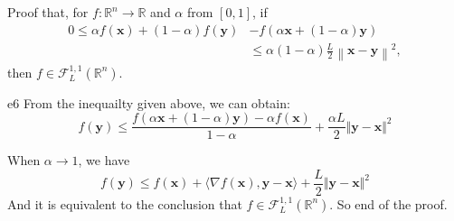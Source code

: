 \documentclass{article}
\newcommand{\xB}{\bm{x}}
\newcommand{\yB}{\bm{y}}
\newcommand{\RBB}{\mathbb{R}}
\newcommand{\FM}{\mathcal{F}}
\newcommand{\functiontype}[3]{\FM_{#1}^{#2,#3}(\RBB^n)}
\newcommand{\normgen}[1]{\left\| #1 \right\|}
\begin{document}
\begin{excercise}\label{e6}
	Proof that, for $f: \RBB^n \rightarrow \RBB$ and $\alpha$ from $[0,1]$,  if
\begin{align*} 
	0  \leq  \alpha f(\xB) + (1-\alpha) f(\yB)  &-  f( \alpha \xB + (1-\alpha) \yB) \nonumber \\
	&\leq \alpha (1-\alpha) \frac{L}{2} \normgen{\xB - \yB}^2,
\end{align*}
	then $f \in \functiontype{L}{1}{1}$.
\end{excercise}
\begin{PROOF}{e6}
	From the inequailty given above, we can obtain:
	\begin{equation}
		f(\yB)\le \frac{f(\alpha \xB+(1-\alpha)\yB)-\alpha f(\xB)}{1-\alpha}+\frac{\alpha L}{2}\Vert \yB-\xB\Vert ^2
	\end{equation}
	
	When $\alpha \rightarrow 1$, we have
	\begin{equation}
		f(\yB)\le f(\xB) +\langle\nabla f(\xB),\yB-\xB\rangle+\frac{L}{2}\Vert \yB-\xB\Vert ^2
	\end{equation} 
	And it is equivalent to the conclusion that $f\in \mathcal{F}_L^{1,1}(\mathbb{R}^n)$. So end of the proof.
\end{PROOF}
\end{document}

